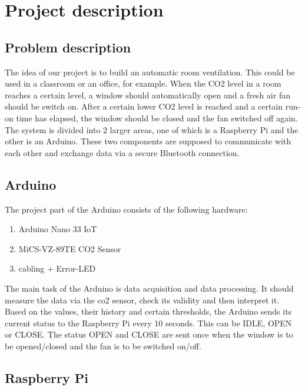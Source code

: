 \section{Project description}
\label{chapter1}

\subsection{Problem description}

The idea of our project is to build an automatic room ventilation. This could be used in a classroom or an office, for example. When the CO2 level in a room reaches a certain level, a window should automatically open and a fresh air fan should be switch on. After a certain lower CO2 level is reached and a certain run-on time has elapsed, the window should be closed and the fan switched off again.\\

The system is divided into 2 larger areas, one of which is a Raspberry Pi and the other is an Arduino. These two components are supposed to communicate with each other and exchange data via a secure Bluetooth connection. 

\subsection{Arduino}

The project part of the Arduino consists of the following hardware:

\begin{enumerate}[label*=\arabic*.]
    \item \label{hw.1} Arduino Nano 33 IoT 
    \item \label{hw.2} MiCS-VZ-89TE CO2 Sensor
    \item \label{hw.3} cabling + Error-LED
\end{enumerate}

The main task of the Arduino is data acquisition and data processing. It should measure the data via the co2 sensor, check its validity and then interpret it. Based on the values, their history and certain thresholds, the Arduino sends its current status to the Raspberry Pi every 10 seconds. This can be IDLE, OPEN or CLOSE. The status OPEN and CLOSE are sent once when the window is to be opened/closed and the fan is to be switched on/off.

\subsection{Raspberry Pi}

